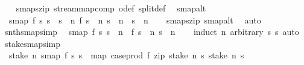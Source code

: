 \begin{isabellebody}
%
\isadelimproof
\ \ %
\endisadelimproof
%
\isatagproof
{}\isamarkupfalse%
\ smap{}{\isacharunderscore}szip\ stream{\isachardot}map{\isacharunderscore}comp\ o{\isacharunderscore}def\ split{\isacharunderscore}def\ \isacommand{{\isachardot}{\isachardot}}\isamarkupfalse%
%
\endisatagproof
{\isafoldproof}%
%
\isadelimproof
\isanewline
%
\endisadelimproof
\isanewline
{}\isamarkupfalse%
\ smap{}{\isacharunderscore}alt{\isacharcolon}\isanewline
\ \ {\isachardoublequoteopen}{\isacharparenleft}smap{}\ f\ s{}\ s{}\ {\isacharequal}\ s{\isacharparenright}\ {\isacharequal}\ {\isacharparenleft}{\isasymforall}n{\isachardot}\ f\ {\isacharparenleft}s{}\ {\isacharbang}{\isacharbang}\ n{\isacharparenright}\ {\isacharparenleft}s{}\ {\isacharbang}{\isacharbang}\ n{\isacharparenright}\ {\isacharequal}\ s\ {\isacharbang}{\isacharbang}\ n{\isacharparenright}{\isachardoublequoteclose}\isanewline
%
\isadelimproof
\ \ %
\endisadelimproof
%
\isatagproof
{}\isamarkupfalse%
\ smap{}{\isacharunderscore}szip\ smap{\isacharunderscore}alt\ \isamarkupfalse%
\ auto%
\endisatagproof
{\isafoldproof}%
%
\isadelimproof
\isanewline
%
\endisadelimproof
\isanewline
{}\isamarkupfalse%
\ snth{\isacharunderscore}smap{}{\isacharbrackleft}simp{\isacharbrackright}{\isacharcolon}\isanewline
\ \ {\isachardoublequoteopen}smap{}\ f\ s{}\ s{}\ {\isacharbang}{\isacharbang}\ n\ {\isacharequal}\ f\ {\isacharparenleft}s{}\ {\isacharbang}{\isacharbang}\ n{\isacharparenright}\ {\isacharparenleft}s{}\ {\isacharbang}{\isacharbang}\ n{\isacharparenright}{\isachardoublequoteclose}\isanewline
%
\isadelimproof
\ \ %
\endisadelimproof
%
\isatagproof
{}\isamarkupfalse%
\ {\isacharparenleft}induct\ n\ arbitrary{\isacharcolon}\ s{}\ s{}{\isacharparenright}\ auto%
\endisatagproof
{\isafoldproof}%
%
\isadelimproof
\isanewline
%
\endisadelimproof
\isanewline
{}\isamarkupfalse%
\ stake{\isacharunderscore}smap{}{\isacharbrackleft}simp{\isacharbrackright}{\isacharcolon}\isanewline
\ \ {\isachardoublequoteopen}stake\ n\ {\isacharparenleft}smap{}\ f\ s{}\ s{}{\isacharparenright}\ {\isacharequal}\ map\ {\isacharparenleft}case{\isacharunderscore}prod\ f{\isacharparenright}\ {\isacharparenleft}zip\ {\isacharparenleft}stake\ n\ s{}{\isacharparenright}\ {\isacharparenleft}stake\ n\ s{}{\isacharparenright}{\isacharparenright}{\isachardoublequoteclose}\isanewline

\end{isabellebody}
